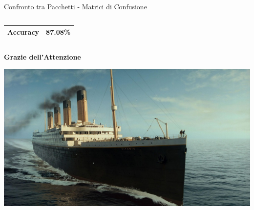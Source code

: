 \documentclass[9pt, xcolor=table]{beamer}
\begin{document}
\begin{frame}{Confronto tra Pacchetti - Matrici di Confusione}
\begin{columns}
\begin{table}[]
{\begin{tabular}{|c|c|c|}
						\textbf{Accuracy}     & \multicolumn{2}{c|}{\cellcolor[HTML]{FCFF2F}\textbf{87.08\%}} \\ \hline
					\end{tabular}
				}
			\end{table}
			\centering
			\begin{table}[]
			\end{table}
		\end{columns}
	\end{frame}

	\begin{frame}
		
		\centering
		\huge \textbf{Grazie dell'Attenzione}
		
		\vfill
		
		\centering
		\includegraphics[scale=0.27]{titanic-sailing}
		
	\end{frame}
\end{document}
